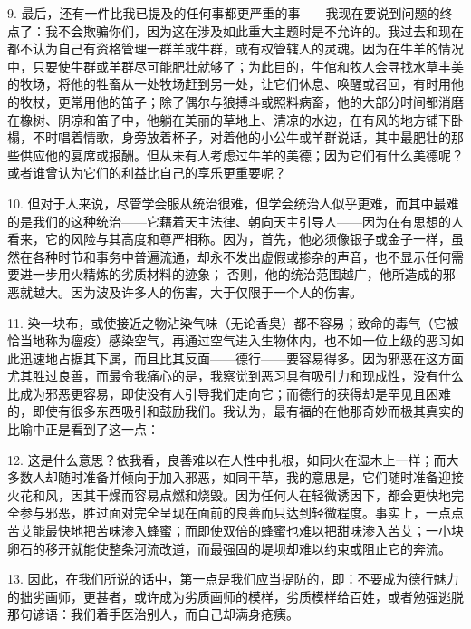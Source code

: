 9. 最后，还有一件比我已提及的任何事都更严重的事——我现在要说到问题的终点了：我不会欺骗你们，因为这在涉及如此重大主题时是不允许的。我过去和现在都不认为自己有资格管理一群羊或牛群，或有权管辖人的灵魂。因为在牛羊的情况中，只要使牛群或羊群尽可能肥壮就够了；为此目的，牛倌和牧人会寻找水草丰美的牧场，将他的牲畜从一处牧场赶到另一处，让它们休息、唤醒或召回，有时用他的牧杖，更常用他的笛子；除了偶尔与狼搏斗或照料病畜，他的大部分时间都消磨在橡树、阴凉和笛子中，他躺在美丽的草地上、清凉的水边，在有风的地方铺下卧榻，不时唱着情歌，身旁放着杯子，对着他的小公牛或羊群说话，其中最肥壮的那些供应他的宴席或报酬。但从未有人考虑过牛羊的美德；因为它们有什么美德呢？或者谁曾认为它们的利益比自己的享乐更重要呢？\par

10. 但对于人来说，尽管学会服从统治很难，但学会统治人似乎更难，而其中最难的是我们的这种统治——它藉着天主法律、朝向天主引导人——因为在有思想的人看来，它的风险与其高度和尊严相称。因为，首先，他必须像银子或金子一样，虽然在各种时节和事务中普遍流通，却永不发出虚假或掺杂的声音，也不显示任何需要进一步用火精炼的劣质材料的迹象； 否则，他的统治范围越广，他所造成的邪恶就越大。因为波及许多人的伤害，大于仅限于一个人的伤害。\par

11. 染一块布，或使接近之物沾染气味（无论香臭）都不容易；致命的毒气（它被恰当地称为瘟疫）感染空气，再通过空气进入生物体内，也不如一位上级的恶习如此迅速地占据其下属，而且比其反面——德行——要容易得多。因为邪恶在这方面尤其胜过良善，而最令我痛心的是，我察觉到恶习具有吸引力和现成性，没有什么比成为邪恶更容易，即使没有人引导我们走向它；而德行的获得却是罕见且困难的，即使有很多东西吸引和鼓励我们。我认为，最有福的在他那奇妙而极其真实的比喻中正是看到了这一点：——\par

12. 这是什么意思？依我看，良善难以在人性中扎根，如同火在湿木上一样；而大多数人却随时准备并倾向于加入邪恶，如同干草，我的意思是，它们随时准备迎接火花和风，因其干燥而容易点燃和烧毁。因为任何人在轻微诱因下，都会更快地完全参与邪恶，胜过面对完全呈现在面前的良善而只达到轻微程度。事实上，一点点苦艾能最快地把苦味渗入蜂蜜；而即使双倍的蜂蜜也难以把甜味渗入苦艾；一小块卵石的移开就能使整条河流改道，而最强固的堤坝却难以约束或阻止它的奔流。\par

13. 因此，在我们所说的话中，第一点是我们应当提防的，即：不要成为德行魅力的拙劣画师，更甚者，或许成为劣质画师的模样，劣质模样给百姓，或者勉强逃脱那句谚语：我们着手医治别人，而自己却满身疮痍。\par


